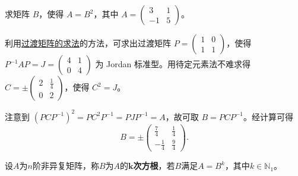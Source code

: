 \documentclass[../../main.tex]{subfiles}
\begin{document}
\begin{example}
求矩阵 $B$，使得 $A = B^2$，其中 $A = \begin{pmatrix}
3 & 1 \\
-1 & 5
\end{pmatrix}$。
\end{example}
\begin{solution}
利用\hyperref[section:过渡矩阵的求法]{过渡矩阵的求法}的方法，可求出过渡矩阵 $P = \begin{pmatrix}
1 & 0 \\
1 & 1
\end{pmatrix}$，使得 $P^{-1}AP = J = \begin{pmatrix}
4 & 1 \\
0 & 4
\end{pmatrix}$ 为 Jordan 标准型。用待定元素法不难求得 $C = \pm\begin{pmatrix}
2 & \frac{1}{4} \\
0 & 2
\end{pmatrix}$，使得 $C^2 = J$。

注意到 $(PCP^{-1})^2 = PC^2P^{-1} = PJP^{-1} = A$，故可取 $B = PCP^{-1}$。经计算可得
\[B = \pm\begin{pmatrix}
\frac{7}{4} & \frac{1}{4} \\
-\frac{1}{4} & \frac{9}{4}
\end{pmatrix}. \]

\end{solution}

\begin{definition}
设$A$为$n$阶非异复矩阵，称$B$为$A$的\textbf{$\boldsymbol{k}$次方根}，若$B$满足$A=B^k$，其中$k\in \mathbb{N} _1$。
\end{definition}
\end{document}
